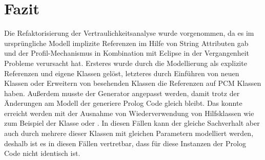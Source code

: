 \documentclass[twoside, ngerman]{sdqseminar}
\begin{document}
\section{Fazit}
Die Refaktorisierung der Vertraulichkeitsanalyse wurde vorgenommen, da es im ursprüngliche Modell implizite Referenzen im Hilfe von String Attributen gab und der Profil-Mechanismus in Kombination mit Eclipse in der Vergangenheit Probleme verursacht hat. Ersteres wurde durch die Modellierung als explizite Referenzen und eigene Klassen gelöst, letzteres durch Einführen von neuen Klassen oder Erweitern von besehenden Klassen die Referenzen auf PCM Klassen haben. Außerdem musste der  Generator angepasst werden, damit trotz der Änderungen am Modell der generiere Prolog Code gleich bleibt. Das konnte erreicht werden mit der Ausnahme von Wiederverwendung von Hilfsklassen wie zum Beispiel der Klasse  oder . In diesen Fällen kann der gleiche Sachverhalt aber auch durch mehrere dieser Klassen mit gleichen Parametern modelliert werden, deshalb ist es in diesen Fällen vertretbar, dass für diese Instanzen der Prolog Code nicht identisch ist.

\printbibliography
\end{document}
